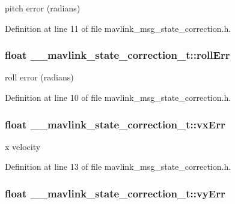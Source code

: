 pitch error (radians) 



Definition at line 11 of file mavlink\-\_\-msg\-\_\-state\-\_\-correction.\-h.

\hypertarget{struct____mavlink__state__correction__t_a9c95891402362b6d10ffc573db2991e9}{
\subsubsection[{roll\-Err}]{\setlength{\rightskip}{0pt plus 5cm}float \-\_\-\-\_\-mavlink\-\_\-state\-\_\-correction\-\_\-t\-::roll\-Err}}\label{struct____mavlink__state__correction__t_a9c95891402362b6d10ffc573db2991e9}


roll error (radians) 



Definition at line 10 of file mavlink\-\_\-msg\-\_\-state\-\_\-correction.\-h.

\hypertarget{struct____mavlink__state__correction__t_a52c6fe18ffee4aee62bbccc79a6bd2cb}{
\subsubsection[{vx\-Err}]{\setlength{\rightskip}{0pt plus 5cm}float \-\_\-\-\_\-mavlink\-\_\-state\-\_\-correction\-\_\-t\-::vx\-Err}}\label{struct____mavlink__state__correction__t_a52c6fe18ffee4aee62bbccc79a6bd2cb}


x velocity 



Definition at line 13 of file mavlink\-\_\-msg\-\_\-state\-\_\-correction.\-h.

\hypertarget{struct____mavlink__state__correction__t_a2db19032f05d6f0b066d7e9a78fa34a7}{
\subsubsection[{vy\-Err}]{\setlength{\rightskip}{0pt plus 5cm}float \-\_\-\-\_\-mavlink\-\_\-state\-\_\-correction\-\_\-t\-::vy\-Err}}\label{struct____mavlink__state__correction__t_a2db19032f05d6f0b066d7e9a78fa34a7}


